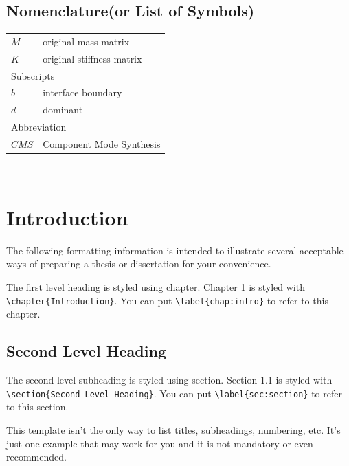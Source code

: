 \documentclass[11pt]{report}
\numberwithin{figure}{section}
\theoremstyle{plain}
\theoremstyle{definition}
\theoremstyle{corollary}
\theoremstyle{definition}
\theoremstyle{plain}
\theoremstyle{definition}
\theoremstyle{plain}
\begin{document}
\newpage
\begin{center}
\section*{Nomenclature(or List of Symbols)}
\end{center}
\normalsize
\begin{tabular}{p{}p{}}
$M$	& original mass matrix\\
$K$	& original stiffness matrix\\[30pt]
\multicolumn{2}{l}{Subscripts}\\
$b$ & interface boundary\\
$d$ & dominant\\[30pt]
\multicolumn{2}{l}{Abbreviation}\\
$CMS$ & Component Mode Synthesis\\
\end{tabular}
\newpage 
\ %


\chapter{Introduction}\label{chap:intro}

The following formatting information is intended to illustrate several acceptable ways of preparing a thesis or dissertation for your convenience.

The first level heading is styled using chapter.
Chapter 1 is styled with\\ \verb|\chapter{Introduction}|.
You can put \verb|\label{chap:intro}| to refer to this chapter.



\section{Second Level Heading}\label{sec:section}
The second level subheading is styled using section.
Section 1.1 is styled with \verb|\section{Second Level Heading}|.
You can put \verb|\label{sec:section}| to refer to this section. \par
This template isn't the only way to list titles, subheadings, numbering, etc. It's just one example that may work for you and it is not mandatory or even recommended.
%
\end{document}
